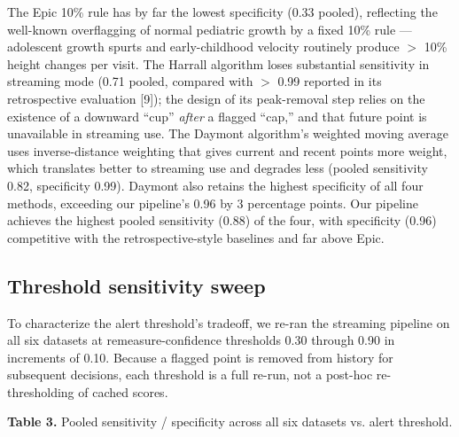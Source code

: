 \documentclass[11pt]{article}
\begin{document}
The Epic 10\% rule has by far the lowest specificity (0.33 pooled), reflecting the well-known overflagging of normal pediatric growth by a fixed 10\% rule --- adolescent growth spurts and early-childhood velocity routinely produce \(>\) 10\% height changes per visit. The Harrall algorithm loses substantial sensitivity in streaming mode (0.71 pooled, compared with \(>\) 0.99 reported in its retrospective evaluation [9]); the design of its peak-removal step relies on the existence of a downward ``cup'' \emph{after} a flagged ``cap,'' and that future point is unavailable in streaming use. The Daymont algorithm's weighted moving average uses inverse-distance weighting that gives current and recent points more weight, which translates better to streaming use and degrades less (pooled sensitivity 0.82, specificity 0.99). Daymont also retains the highest specificity of all four methods, exceeding our pipeline's 0.96 by 3 percentage points. Our pipeline achieves the highest pooled sensitivity (0.88) of the four, with specificity (0.96) competitive with the retrospective-style baselines and far above Epic.

\subsection{Threshold sensitivity sweep}\label{threshold-sensitivity-sweep}

To characterize the alert threshold's tradeoff, we re-ran the streaming pipeline on all six datasets at remeasure-confidence thresholds 0.30 through 0.90 in increments of 0.10. Because a flagged point is removed from history for subsequent decisions, each threshold is a full re-run, not a post-hoc re-thresholding of cached scores.

\textbf{Table 3.} Pooled sensitivity / specificity across all six datasets vs. alert threshold.
\end{document}
